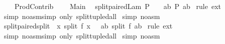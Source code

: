 %
\begin{isabellebody}%
\def\isabellecontext{ProdContrib}%
%
\isadelimtheory
\isanewline
\isanewline
\isanewline
%
\endisadelimtheory
%
\isatagtheory
{}\isamarkupfalse%
\ \ \ \ ProdContrib\ \isanewline
{}\ \ \ Main\ \isanewline
{}%
\endisatagtheory
{\isafoldtheory}%
%
\isadelimtheory
\isanewline
%
\endisadelimtheory
\isanewline
\isanewline
{}\isamarkupfalse%
\ split{\isacharunderscore}paired{\isacharunderscore}Lam{\isacharcolon}\ {\isachardoublequoteopen}P\ {\isacharequal}\ {\isacharparenleft}{\isasymlambda}\ \ {\isacharparenleft}a{\isacharcomma}b{\isacharparenright}{\isachardot}\ P\ {\isacharparenleft}a{\isacharcomma}b{\isacharparenright}{\isacharparenright}{\isachardoublequoteclose}\isanewline
%
\isadelimproof
%
\endisadelimproof
%
\isatagproof
{}\isamarkupfalse%
\ {\isacharparenleft}rule\ ext{\isacharparenright}\isanewline
{}\isamarkupfalse%
\ {\isacharparenleft}simp\ {\isacharparenleft}no{\isacharunderscore}asm{\isacharunderscore}simp{\isacharparenright}\ only{\isacharcolon}\ split{\isacharunderscore}tupled{\isacharunderscore}all{\isacharparenright}\isanewline
{}\isamarkupfalse%
\ {\isacharparenleft}simp\ {\isacharparenleft}no{\isacharunderscore}asm{\isacharparenright}{\isacharparenright}\isanewline
{}\isamarkupfalse%
%
\endisatagproof
{\isafoldproof}%
%
\isadelimproof
\isanewline
%
\endisadelimproof
\isanewline
{}\isamarkupfalse%
\ split{\isacharunderscore}paired{\isacharunderscore}split{\isacharcolon}\ {\isachardoublequoteopen}{\isacharparenleft}{\isacharpercent}\ x{\isachardot}\ split\ f\ x{\isacharparenright}\ {\isacharequal}\ {\isacharparenleft}{\isacharpercent}\ {\isacharparenleft}a{\isacharcomma}b{\isacharparenright}{\isachardot}\ split\ f\ {\isacharparenleft}a{\isacharcomma}b{\isacharparenright}{\isacharparenright}{\isachardoublequoteclose}\isanewline
%
\isadelimproof
%
\endisadelimproof
%
\isatagproof
{}\isamarkupfalse%
\ {\isacharparenleft}rule\ ext{\isacharparenright}\isanewline
{}\isamarkupfalse%
\ {\isacharparenleft}simp\ {\isacharparenleft}no{\isacharunderscore}asm{\isacharunderscore}simp{\isacharparenright}\ only{\isacharcolon}\ split{\isacharunderscore}tupled{\isacharunderscore}all{\isacharparenright}\isanewline
{}\isamarkupfalse%
\ {\isacharparenleft}simp\ {\isacharparenleft}no{\isacharunderscore}asm{\isacharparenright}{\isacharparenright}\isanewline
{}\isamarkupfalse%
%
\endisatagproof
{\isafoldproof}%

\end{isabellebody}
